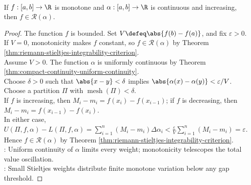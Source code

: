 \begin{theorem} \label{thm:monotone-functions-integrable-continuous-integrator} \\
If $f:[a,b]\to\R$ is monotone and $\alpha:[a,b]\to\R$ is continuous and increasing, then $f\in\mathcal{R}(\alpha)$.
\begin{proof}
The function $f$ is bounded. Set $V\defeq\abs{f(b)-f(a)}$, and fix $\varepsilon>0$.\\
If $V=0$, monotonicity makes $f$ constant, so $f\in\mathcal{R}(\alpha)$ by Theorem \ref{thm:riemann-stieltjes-integrability-criterion}.\\
Assume $V>0$. The function $\alpha$ is uniformly continuous by Theorem \ref{thm:compact-continuity-uniform-continuity}.\\
Choose $\delta>0$ such that $\abs{x-y}<\delta$ implies $\abs{\alpha(x)-\alpha(y)}<\varepsilon/V$. Choose a partition $\Pi$ with $\operatorname{mesh}(\Pi)<\delta$.\\
If $f$ is increasing, then $M_i-m_i=f(x_i)-f(x_{i-1})$; if $f$ is decreasing, then $M_i-m_i=f(x_{i-1})-f(x_i)$.\\
In either case, $U(\Pi,f,\alpha)-L(\Pi,f,\alpha) =\sum\limits_{i=1}^{n}(M_i-m_i)\Delta\alpha_i <\frac{\varepsilon}{V}\sum\limits_{i=1}^{n}(M_i-m_i) =\varepsilon$. Hence $f\in\mathcal{R}(\alpha)$ by Theorem \ref{thm:riemann-stieltjes-integrability-criterion}.\\
: Uniform continuity of $\alpha$ limits every weight; monotonicity telescopes the total value oscillation.\\
: Small Stieltjes weights distribute finite monotone variation below any gap threshold.
\end{proof}
\end{theorem}

